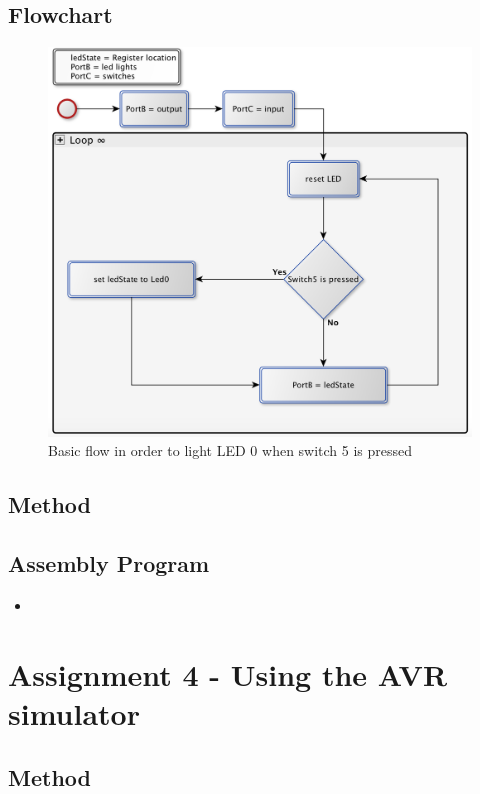 \documentclass[a4paper, 12pt]{article}
\newcommand{\avrasm}[2]{
\begin{itemize}
\item[]
\end{itemize}
}
\begin{document}
\subsection{Flowchart}
\begin{figure}[h]
\centering
\includegraphics[scale=0.5]{Flowchart_pics/assignment3_pic.png} 
\caption{Basic flow in order to light LED 0 when switch 5 is pressed}
\label{}
\end{figure}

\subsection{Method}

\newpage

\subsection{Assembly Program}
\avrasm{../src/a3.asm}{}
\newpage

\section{Assignment 4 - Using the AVR simulator}


\subsection{Method}

\newpage
\end{document}
